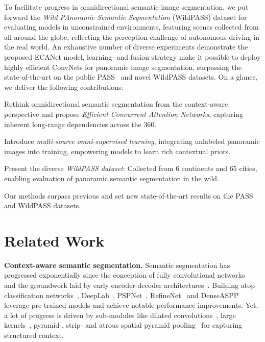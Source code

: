 \documentclass[final]{cvpr}
\begin{document}
To facilitate progress in omnidirectional semantic image segmentation, we put forward the \emph{Wild PAnoramic Semantic Segmentation} (WildPASS) dataset for evaluating models in unconstrained environments, featuring scenes collected from all around the globe, reflecting the perception challenge of autonomous driving in the real world.
An exhaustive number of diverse experiments demonstrate the proposed ECANet model, learning- and fusion strategy make it possible to deploy highly efficient ConvNets for panoramic image segmentation, surpassing the state-of-the-art on the public PASS~\cite{yang2020pass} and novel WildPASS datasets.
On a glance, we deliver the following contributions:
\begin{compactitem}
    \item Rethink omnidirectional semantic segmentation from the context-aware perspective and propose \emph{Efficient Concurrent Attention Networks}, capturing inherent long-range dependencies across the 360.
    \item Introduce \emph{multi-source omni-supervised learning}, integrating unlabeled panoramic images into training, empowering models to learn rich contextual priors.
    \item Present the diverse \emph{WildPASS dataset}: Collected from 6 continents and 65 cities, enabling evaluation of panoramic semantic segmentation in the wild.
    \item Our methods surpass previous and set new state-of-the-art results on the PASS and WildPASS datasets.
\end{compactitem}

\section{Related Work}
\noindent
\textbf{Context-aware semantic segmentation.}
Semantic segmentation has progressed exponentially
since the conception of fully convolutional networks~\cite{long2015fully}
and the groundwork laid by early encoder-decoder architectures~\cite{badrinarayanan2017segnet,noh2015learning,ronneberger2015u}.
Building atop classification networks~\cite{he2016deep,huang2017densely}, DeepLab~\cite{chen2017deeplab,chen2018encoder}, PSPNet~\cite{zhao2017pyramid}, RefineNet~\cite{lin2017refinenet} and DenseASPP~\cite{yang2018denseaspp} 
leverage pre-trained models and achieve notable performance improvements.
Yet, a lot of progress is driven by sub-modules like dilated convolutions~\cite{yu2015multi},
large kernels~\cite{peng2017large},
pyramid-, strip- and atrous spatial pyramid pooling~\cite{chen2017deeplab,hou2020strip,zhao2017pyramid}
for capturing structured context.
\end{document}
